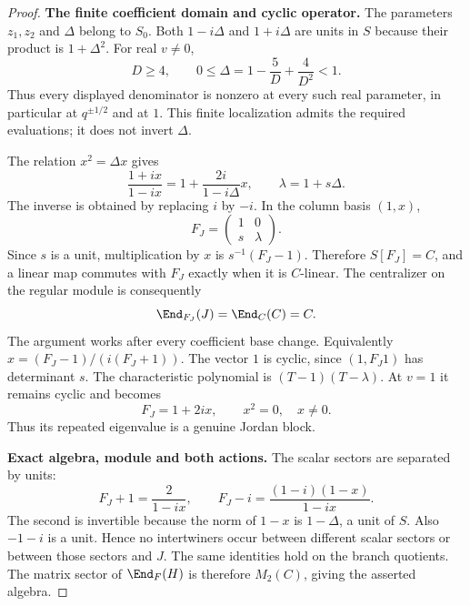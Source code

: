 \begin{proof}
\par\smallskip\noindent\textbf{The finite coefficient domain and cyclic operator.}\quad
The parameters $z_1,z_2$ and $\Delta$ belong to $S_0$. Both $1-i\Delta$ and
$1+i\Delta$ are units in $S$ because their product is
$1+\Delta^2$. For real $v\ne0$,
\[
 D\ge4,\qquad
 0\le\Delta=1-\frac5D+\frac4{D^2}<1.
\]
Thus every displayed denominator is nonzero at every such real
parameter, in particular at $q^{\pm1/2}$ and at $1$. This finite
localization admits the required evaluations; it does not
invert $\Delta$.

The relation $x^2=\Delta x$ gives
\[
 \frac{1+ix}{1-ix}=1+\frac{2i}{1-i\Delta}x,\qquad
 \lambda=1+s\Delta.
\]
The inverse is obtained by replacing $i$ by $-i$.
In the column basis $(1,x)$,
\begin{equation}\label{eq:cayleymatrix}
 F_J=\begin{pmatrix}1&0\\s&\lambda\end{pmatrix}.
\end{equation}
Since $s$ is a unit, multiplication by $x$ is
$s^{-1}(F_J-1)$. Therefore $S[F_J]=C$, and a linear map
commutes with $F_J$ exactly when it is $C$-linear.
The centralizer on the regular module is consequently
\[
 \End_{F_J}(J)=\End_C(C)=C.
\]
The argument works after every coefficient base change.
Equivalently $x=(F_J-1)/(i(F_J+1))$.
The vector $1$ is cyclic, since $(1,F_J1)$ has determinant $s$.
The characteristic polynomial is $(T-1)(T-\lambda)$.
At $v=1$ it remains cyclic and becomes
\[
 F_J=1+2ix,\qquad x^2=0,\quad x\ne0.
\]
Thus its repeated eigenvalue is a genuine Jordan block.

\par\smallskip\noindent\textbf{Exact algebra, module and both actions.}\quad
The scalar sectors are separated by units:
\[
 F_J+1=\frac2{1-ix},\qquad
 F_J-i=\frac{(1-i)(1-x)}{1-ix}.
\]
The second is invertible because the norm of $1-x$ is
$1-\Delta$, a unit of $S$. Also $-1-i$ is a unit.
Hence no intertwiners occur between different scalar sectors
or between those sectors and $J$. The same identities hold
on the branch quotients. The matrix sector of $\End_F(H)$ is
therefore $M_2(C)$, giving the asserted algebra.


\end{proof}
